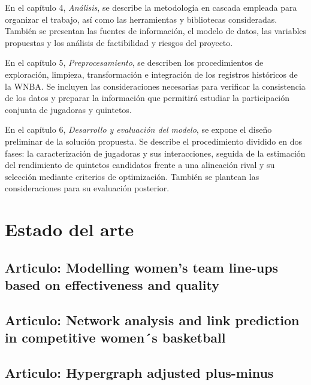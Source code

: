 \documentclass[12pt,letterpaper]{report}
\begin{document}
En el capítulo 4, \textit{Análisis}, se describe la metodología en cascada empleada para organizar el trabajo, así como las herramientas y bibliotecas consideradas. También se presentan las fuentes de información, el modelo de datos, las variables propuestas y los análisis de factibilidad y riesgos del proyecto.

En el capítulo 5, \textit{Preprocesamiento}, se describen los procedimientos de exploración, limpieza, transformación e integración de los registros históricos de la WNBA. Se incluyen las consideraciones necesarias para verificar la consistencia de los datos y preparar la información que permitirá estudiar la participación conjunta de jugadoras y quintetos.

En el capítulo 6, \textit{Desarrollo y evaluación del modelo}, se expone el diseño preliminar de la solución propuesta. Se describe el procedimiento dividido en dos fases: la caracterización de jugadoras y sus interacciones, seguida de la estimación del rendimiento de quintetos candidatos frente a una alineación rival y su selección mediante criterios de optimización. También se plantean las consideraciones para su evaluación posterior.

\chapter{Estado del arte}

\section{Articulo: Modelling women’s team line-ups based on effectiveness and quality}

\section{Articulo: Network analysis and link prediction in competitive women´s basketball}


\section{Articulo: Hypergraph adjusted plus-minus}

\end{document}

